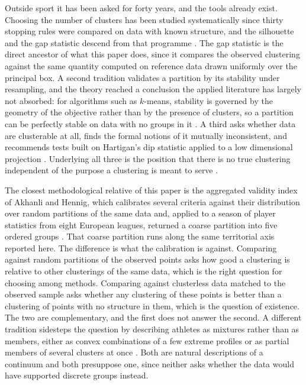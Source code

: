 Outside sport it has been asked for forty years, and the tools already exist. Choosing the
number of clusters has been studied systematically since thirty stopping rules were compared
on data with known structure, and the silhouette and the gap statistic descend from that
programme \citep{milligan1985examination, rousseeuw1987silhouettes, tibshirani2001estimating}.
The gap statistic is the direct ancestor of what this paper does, since it compares the
observed clustering against the same quantity computed on reference data drawn uniformly over
the principal box. A second tradition validates a partition by its stability under resampling,
and the theory reached a conclusion the applied literature has largely not absorbed: for
algorithms such as $k$-means, stability is governed by the geometry of the objective rather
than by the presence of clusters, so a partition can be perfectly stable on data with no
groups in it \citep{benhur2002stability, vonluxburg2010stability}. A third asks whether data
are clusterable at all, finds the formal notions of it mutually inconsistent, and recommends
tests built on Hartigan's dip statistic applied to a low dimensional projection
\citep{ackerman2009clusterability, adolfsson2019cluster, hartigan1985dip}. Underlying all
three is the position that there is no true clustering independent of the purpose a clustering
is meant to serve \citep{hennig2015true}.

The closest methodological relative of this paper is the aggregated validity index of Akhanli
and Hennig, which calibrates several criteria against their distribution over random
partitions of the same data and, applied to a season of player statistics from eight European
leagues, returned a coarse partition into five ordered groups \citep{akhanli2020comparing,
akhanli2023clustering}. That coarse partition runs along the same territorial axis reported
here. The difference is what the calibration is against. Comparing against random partitions
of the observed points asks how good a clustering is relative to other clusterings of the same
data, which is the right question for choosing among methods. Comparing against clusterless
data matched to the observed sample asks whether any clustering of these points is better than
a clustering of points with no structure in them, which is the question of existence. The two
are complementary, and the first does not answer the second. A different tradition sidesteps
the question by describing athletes as mixtures rather than as members, either as convex
combinations of a few extreme profiles or as partial members of several clusters at once
\citep{eugster2012performance, seri2024partial}. Both are natural descriptions of a continuum
and both presuppose one, since neither asks whether the data would have supported discrete
groups instead.

